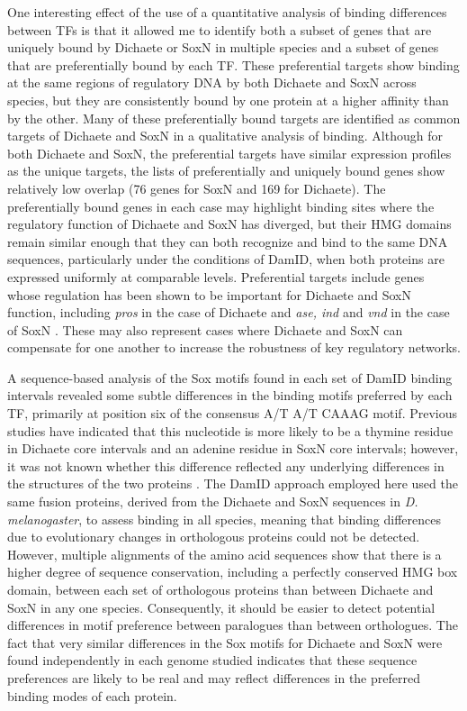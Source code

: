 One interesting effect of the use of a quantitative analysis of binding differences between TFs is that it allowed me to identify both a subset of genes that are uniquely bound by Dichaete or SoxN in multiple species and a subset of genes that are preferentially bound by each TF. These preferential targets show binding at the same regions of regulatory DNA by both Dichaete and SoxN across species, but they are consistently bound by one protein at a higher affinity than by the other. Many of these preferentially bound targets are identified as common targets of Dichaete and SoxN in a qualitative analysis of binding. Although for both Dichaete and SoxN, the preferential targets have similar expression profiles as the unique targets, the lists of preferentially and uniquely bound genes show relatively low overlap (76 genes for SoxN and 169 for Dichaete). The preferentially bound genes in each case may highlight binding sites where the regulatory function of Dichaete and SoxN has diverged, but their HMG domains remain similar enough that they can both recognize and bind to the same DNA sequences, particularly under the conditions of DamID, when both proteins are expressed uniformly at comparable levels. Preferential targets include genes whose regulation has been shown to be important for Dichaete and SoxN function, including \emph{pros} in the case of Dichaete and \emph{ase, ind} and \emph{vnd} in the case of SoxN \citep{aleksic_role_2013,ferrero_soxneuro_2014,overton_evidence_2002}. These may also represent cases where Dichaete and SoxN can compensate for one another to increase the robustness of key regulatory networks.

A sequence-based analysis of the Sox motifs found in each set of DamID binding intervals revealed some subtle differences in the binding motifs preferred by each TF, primarily at position six of the consensus A/T A/T CAAAG motif. Previous studies have indicated that this nucleotide is more likely to be a thymine residue in Dichaete core intervals and an adenine residue in SoxN core intervals; however, it was not known whether this difference reflected any underlying differences in the structures of the two proteins \citep{aleksic_role_2013,ferrero_soxneuro_2014}. The DamID approach employed here used the same fusion proteins, derived from the Dichaete and SoxN sequences in \emph{D. melanogaster}, to assess binding in all species, meaning that binding differences due to evolutionary changes in orthologous proteins could not be detected. However, multiple alignments of the amino acid sequences show that there is a higher degree of sequence conservation, including a perfectly conserved HMG box domain, between each set of orthologous proteins than between Dichaete and SoxN in any one species. Consequently, it should be easier to detect potential differences in motif preference between paralogues than between orthologues. The fact that very similar differences in the Sox motifs for Dichaete and SoxN were found independently in each genome studied indicates that these sequence preferences are likely to be real and may reflect differences in the preferred binding modes of each protein.

